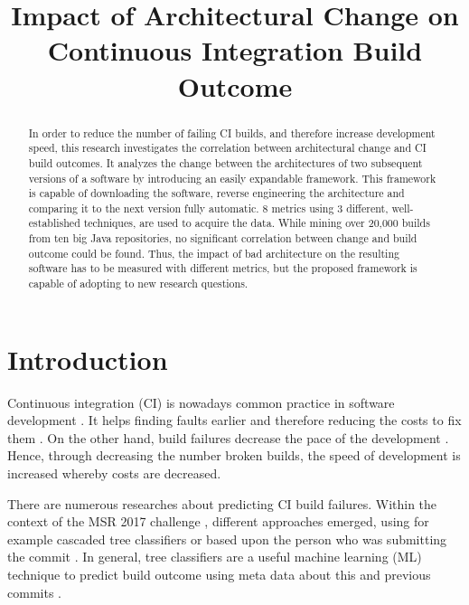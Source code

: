 \documentclass[conference]{IEEEtran}
\begin{document}
\title{Impact of Architectural Change on
	Continuous Integration Build Outcome\\
}

\author{
}

\maketitle

\begin{abstract}
In order to reduce the number of failing CI builds, and therefore increase development speed, this research investigates the correlation between architectural change and CI build outcomes. 
It analyzes the change between the architectures of two subsequent versions of a software by introducing an easily expandable framework.
This framework is capable of downloading the software, reverse engineering the architecture and comparing it to the next version fully automatic. 
8 metrics using 3 different, well-established techniques, are used to acquire the data. While mining over 20,000 builds from ten big Java repositories, no significant correlation between change and build outcome could be found. 
Thus, the impact of bad architecture on the resulting software has to be measured with different metrics, but the proposed framework is capable of adopting to new research questions.
\end{abstract}

\section{Introduction}

Continuous integration (CI) is nowadays common practice in software development \cite{CI-Common}. It helps finding faults earlier and therefore reducing the costs to fix them \cite{NutzenCI}. On the other hand, build failures decrease the pace of the development \cite{Costs-BuildFailures}. Hence, through decreasing the number broken builds, the speed of development is increased whereby costs are decreased.

There are numerous researches about predicting CI build failures. Within the context of the MSR 2017 challenge \cite{TravisTorrent}, different approaches emerged, using for example cascaded tree classifiers \cite{Pred-Cascade} or based upon the person who was submitting the commit \cite{ContrInvolv}. In general, tree classifiers are a useful machine learning (ML) technique to predict build outcome using meta data about this and previous commits \cite{Pred-Tree, ML-Project}. 
\end{document}
